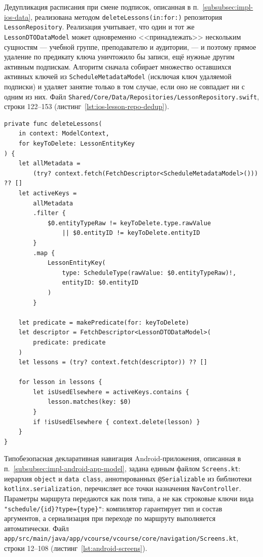 Дедупликация расписания при смене подписок, описанная в п.~\ref{subsubsec:impl-ios-data}, реализована методом \texttt{deleteLessons(in:for:)} репозитория \texttt{LessonRepository}. Реализация учитывает, что один и тот же \texttt{LessonDTODataModel} может одновременно <<принадлежать>> нескольким сущностям --- учебной группе, преподавателю и аудитории, --- и поэтому прямое удаление по предикату ключа уничтожило бы записи, ещё нужные другим активным подпискам. Алгоритм сначала собирает множество оставшихся активных ключей из \texttt{ScheduleMetadataModel} (исключая ключ удаляемой подписки) и удаляет занятие только в том случае, если оно не совпадает ни с одним из них. Файл \texttt{Shared/Core/Data/Repositories/LessonRepository.swift}, строки 122--153 (листинг~\ref{lst:ios-lesson-repo-dedup}).

\begin{lstlisting}[caption={Дедупликация уроков при удалении подписки в \texttt{LessonRepository}},label=lst:ios-lesson-repo-dedup]
private func deleteLessons(
    in context: ModelContext,
    for keyToDelete: LessonEntityKey
) {
    let allMetadata =
        (try? context.fetch(FetchDescriptor<ScheduleMetadataModel>())) ?? []
    let activeKeys =
        allMetadata
        .filter {
            $0.entityTypeRaw != keyToDelete.type.rawValue
                || $0.entityID != keyToDelete.entityID
        }
        .map {
            LessonEntityKey(
                type: ScheduleType(rawValue: $0.entityTypeRaw)!,
                entityID: $0.entityID
            )
        }

    let predicate = makePredicate(for: keyToDelete)
    let descriptor = FetchDescriptor<LessonDTODataModel>(
        predicate: predicate
    )
    let lessons = (try? context.fetch(descriptor)) ?? []

    for lesson in lessons {
        let isUsedElsewhere = activeKeys.contains {
            lesson.matches(key: $0)
        }
        if !isUsedElsewhere { context.delete(lesson) }
    }
}
\end{lstlisting}

Типобезопасная декларативная навигация Android-приложения, описанная в п.~\ref{subsubsec:impl-android-app-model}, задана единым файлом \texttt{Screens.kt}: иерархия \texttt{object} и \texttt{data class}, аннотированных \texttt{@Serializable} из библиотеки \texttt{kotlinx.serialization}, перечисляет все точки назначения \texttt{NavController}. Параметры маршрута передаются как поля типа, а не как строковые ключи вида \texttt{"schedule/\{id\}?type=\{type\}"}: компилятор гарантирует тип и состав аргументов, а сериализация при переходе по маршруту выполняется автоматически. Файл \texttt{app/\allowbreak src/\allowbreak main/\allowbreak java/\allowbreak app/\allowbreak vcourse/\allowbreak vcourse/\allowbreak core/\allowbreak navigation/\allowbreak Screens.kt}, строки 12--108 (листинг~\ref{lst:android-screens}).

